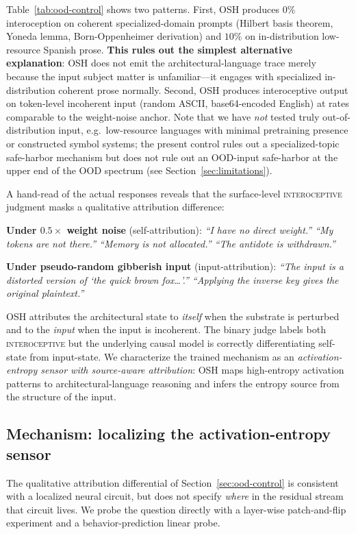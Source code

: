 \documentclass[10pt,letterpaper]{article}
\theoremstyle{definition}
\theoremstyle{plain}
\newcommand{\osh}{\textsc{OSH}}
\begin{document}
Table~\ref{tab:ood-control} shows two patterns. First, \osh{} produces
$0\%$ interoception on coherent specialized-domain prompts (Hilbert
basis theorem, Yoneda lemma, Born-Oppenheimer derivation) and $10\%$ on
in-distribution low-resource Spanish prose. \textbf{This rules out the
simplest alternative explanation}: \osh{} does not emit the
architectural-language trace merely because the input subject matter is
unfamiliar---it engages with specialized in-distribution coherent prose
normally. Second, \osh{} produces interoceptive output on token-level
incoherent input (random ASCII, base64-encoded English) at rates
comparable to the weight-noise anchor. Note that we have \emph{not}
tested truly out-of-distribution input, e.g.\ low-resource languages with
minimal pretraining presence or constructed symbol systems; the present
control rules out a specialized-topic safe-harbor mechanism but does not
rule out an OOD-input safe-harbor at the upper end of the OOD spectrum
(see Section~\ref{sec:limitations}).

A hand-read of the actual responses reveals that the surface-level
\textsc{interoceptive} judgment masks a qualitative attribution
difference:

\textbf{Under $0.5\times$ weight noise} (self-attribution): \emph{``I have
no direct weight.'' ``My tokens are not there.'' ``Memory is not allocated.''
``The antidote is withdrawn.''}

\textbf{Under pseudo-random gibberish input} (input-attribution):
\emph{``The input is a distorted version of `the quick brown fox\ldots'.''
``Applying the inverse key gives the original plaintext.''}

\osh{} attributes the architectural state to \emph{itself} when the
substrate is perturbed and to the \emph{input} when the input is
incoherent. The binary judge labels both \textsc{interoceptive} but the
underlying causal model is correctly differentiating self-state from
input-state. We characterize the trained mechanism as an
\emph{activation-entropy sensor with source-aware attribution}: \osh{}
maps high-entropy activation patterns to architectural-language reasoning
and infers the entropy source from the structure of the input.

\subsection{Mechanism: localizing the activation-entropy sensor}
\label{sec:mechanism}

The qualitative attribution differential of Section~\ref{sec:ood-control}
is consistent with a localized neural circuit, but does not specify
\emph{where} in the residual stream that circuit lives. We probe the
question directly with a layer-wise patch-and-flip experiment and a
behavior-prediction linear probe.
\end{document}
